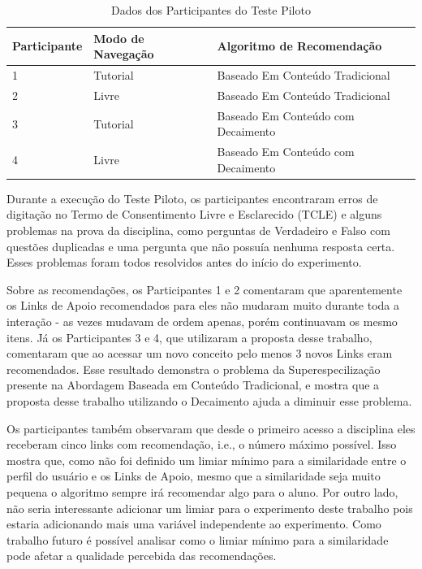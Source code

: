 \begin{table}[h]
\footnotesize
\caption[Dados dos Participantes do Teste Piloto]{Dados dos Participantes do Teste Piloto}
\label{tab:participantes-teste-piloto}
\centering
\begin{tabular}{|p{2cm}|p{2.5cm}|p{2.5cm}|}
  \hline
  \textbf{Participante} & \textbf{Modo de Navegação} & \textbf{Algoritmo de Recomendação} \\
  \hline
  1 & Tutorial & Baseado Em Conteúdo Tradicional \\
  \hline
  2 & Livre & Baseado Em Conteúdo Tradicional \\
  \hline
  3 & Tutorial & Baseado Em Conteúdo com Decaimento \\
  \hline
  4 & Livre & Baseado Em Conteúdo com Decaimento \\
  \hline
\end{tabular}
\end{table}

Durante a execução do Teste Piloto, os participantes encontraram erros de digitação no Termo de Consentimento Livre e Esclarecido (TCLE)
e alguns problemas na prova da disciplina, como perguntas de Verdadeiro e Falso com questões duplicadas e uma
pergunta que não possuía nenhuma resposta certa. Esses problemas foram todos resolvidos antes do início do experimento.

Sobre as recomendações, os Participantes 1 e 2 comentaram que aparentemente os Links de Apoio recomendados para eles não
mudaram muito durante toda a interação - as vezes mudavam de ordem apenas, porém continuavam os mesmo itens. Já os Participantes
3 e 4, que utilizaram a proposta desse trabalho, comentaram que ao acessar um novo conceito pelo menos 3 novos Links eram
recomendados. Esse resultado demonstra o problema da Superespecilização presente na Abordagem Baseada em Conteúdo Tradicional,
e mostra que a proposta desse trabalho utilizando o Decaimento ajuda a diminuir esse problema.

Os participantes também observaram que desde o primeiro acesso a disciplina eles receberam cinco links com recomendação, i.e.,
o número máximo possível. Isso mostra que, como não foi definido um limiar mínimo para a similaridade entre o perfil do usuário
e os Links de Apoio, mesmo que a similaridade seja muito pequena o algoritmo sempre irá recomendar algo para o aluno. Por
outro lado, não seria interessante adicionar um limiar para o experimento deste trabalho pois estaria adicionando
mais uma variável independente ao experimento. Como trabalho futuro é possível analisar como o limiar mínimo para a
similaridade pode afetar a qualidade percebida das recomendações.

